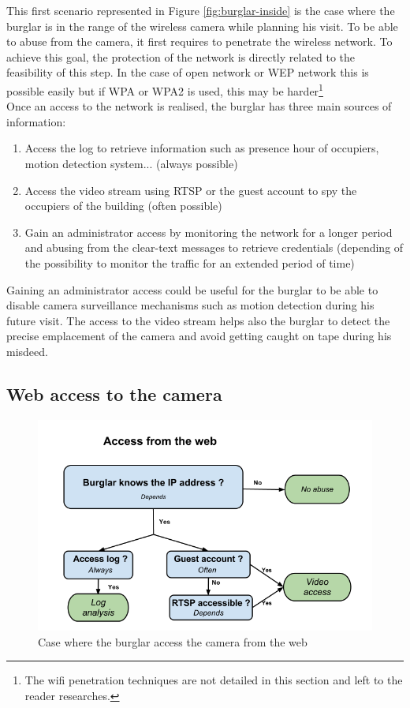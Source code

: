 This first scenario represented in Figure \ref{fig:burglar-inside} is the case where the burglar is in the range of the wireless camera while planning his visit.
To be able to abuse from the camera, it first requires to penetrate the wireless network.
To achieve this goal, the protection of the network is directly related to the feasibility of this step.
In the case of open network or WEP network this is possible easily but if WPA or WPA2 is used, this may be harder\footnote{The wifi penetration techniques are not detailed in this section and left to the reader researches.}\\

Once an access to the network is realised, the burglar has three main sources of information:
\begin{enumerate}
\item Access the log to retrieve information such as presence hour of occupiers, motion detection system... (always possible)
\item Access the video stream using RTSP or the guest account to spy the occupiers of the building (often possible)
\item Gain an administrator access by monitoring the network for a longer period and abusing from the clear-text messages to retrieve credentials (depending of the possibility to monitor the traffic for an extended period of time)
\end{enumerate}

Gaining an administrator access could be useful for the burglar to be able to disable camera surveillance mechanisms such as motion detection during his future visit.
The access to the video stream helps also the burglar to detect the precise emplacement of the camera and avoid getting caught on tape during his misdeed.

\subsection{Web access to the camera}

\begin{figure}[h]
  \centering
  \includegraphics[width=13cm]{images/burglar-outside.png}
  \caption{Case where the burglar access the camera from the web}
  \label{fig:burglar-outside}
\end{figure}

